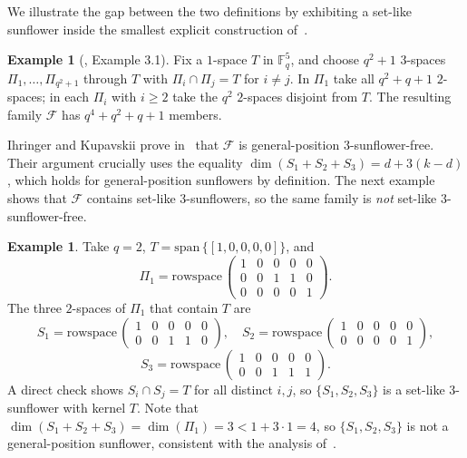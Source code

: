 \documentclass[11pt]{article}
\theoremstyle{definition}
\newtheorem{example}[theorem]{Example}
\newcommand{\F}{\mathbb{F}}
\newcommand{\rs}{\mathrm{rowspace}\,}
\newcommand{\spn}{\mathrm{span}\,}
\begin{document}
We illustrate the gap between the two definitions by exhibiting a set-like sunflower inside the smallest explicit construction of~\cite{ik2026}.

\begin{example}[\cite{ik2026}, Example 3.1]\label{ex:ik-example}
Fix a $1$-space $T$ in $\F_q^5$, and choose $q^2 + 1$ $3$-spaces $\Pi_1, \ldots, \Pi_{q^2+1}$ through $T$ with $\Pi_i \cap \Pi_j = T$ for $i \neq j$. In $\Pi_1$ take all $q^2 + q + 1$ $2$-spaces; in each $\Pi_i$ with $i \geq 2$ take the $q^2$ $2$-spaces disjoint from $T$. The resulting family $\mathcal{F}$ has $q^4 + q^2 + q + 1$ members.
\end{example}

Ihringer and Kupavskii prove in~\cite{ik2026} that $\mathcal{F}$ is general-position $3$-sunflower-free. Their argument crucially uses the equality $\dim(S_1+S_2+S_3) = d + 3(k-d)$, which holds for general-position sunflowers by definition. The next example shows that $\mathcal{F}$ contains set-like $3$-sunflowers, so the same family is \emph{not} set-like $3$-sunflower-free.

\begin{example}\label{ex:counter}
Take $q = 2$, $T = \spn\{[1,0,0,0,0]\}$, and
\[
\Pi_1 = \rs\begin{pmatrix} 1 & 0 & 0 & 0 & 0 \\ 0 & 0 & 1 & 1 & 0 \\ 0 & 0 & 0 & 0 & 1 \end{pmatrix}.
\]
The three $2$-spaces of $\Pi_1$ that contain $T$ are
\[
S_1 = \rs\begin{pmatrix} 1 & 0 & 0 & 0 & 0 \\ 0 & 0 & 1 & 1 & 0 \end{pmatrix}, \quad
S_2 = \rs\begin{pmatrix} 1 & 0 & 0 & 0 & 0 \\ 0 & 0 & 0 & 0 & 1 \end{pmatrix},
\]
\[
S_3 = \rs\begin{pmatrix} 1 & 0 & 0 & 0 & 0 \\ 0 & 0 & 1 & 1 & 1 \end{pmatrix}.
\]
A direct check shows $S_i \cap S_j = T$ for all distinct $i, j$, so $\{S_1, S_2, S_3\}$ is a set-like $3$-sunflower with kernel $T$. Note that $\dim(S_1 + S_2 + S_3) = \dim(\Pi_1) = 3 < 1 + 3 \cdot 1 = 4$, so $\{S_1, S_2, S_3\}$ is not a general-position sunflower, consistent with the analysis of~\cite{ik2026}.
\end{example}
\end{document}
